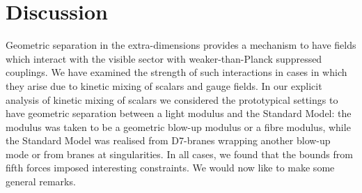 \documentclass[11pt,a4paper]{article}
\begin{document}
\section{Discussion}
\label{sec:disc}

Geometric separation in the extra-dimensions provides a mechanism to have fields which interact with the visible sector with weaker-than-Planck suppressed couplings. We have examined the strength of such interactions in cases in which they arise due to kinetic mixing of scalars and gauge fields. In our explicit analysis of kinetic mixing of scalars we considered the prototypical settings to have geometric separation between a light modulus and the Standard Model: the modulus was 
taken to be a geometric blow-up modulus or a fibre modulus, while  the Standard Model was realised from D7-branes wrapping another blow-up mode or from branes at singularities. In all cases, we found that the bounds from fifth forces imposed interesting constraints. We would now like to make some general remarks.
\end{document}
